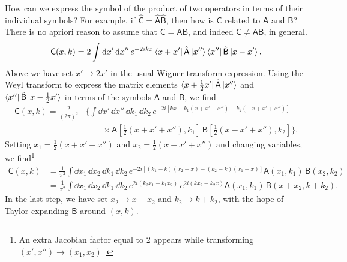 How can we express the symbol of the product of two operators in terms of their individual symbols?
For example, if $\hat{\mathsf{C}} = \hat{\mathsf{A}}\hat{\mathsf{B}}$, then how is $\mathsf{C}$ related to $\mathsf{A}$ and $\mathsf{B}$?
There is no apriori reason to assume that $\mathsf{C} = \mathsf{A}\mathsf{B}$, and indeed $\mathsf{C} \neq \mathsf{A}\mathsf{B}$, in general.
%
\begin{equation}
  \mathsf{C}(x, k) = 2\int \mathrm{d}{x'}\, \mathrm{d}{x''} \,e^{-2ikx} \mathinner{\langle{x + x'}\rvert}\hat{\mathsf{A}}\mathinner{\lvert{x''}\rangle}\mathinner{\langle{x''}\rvert}\hat{\mathsf{B}}\mathinner{\lvert{x - x'}\rangle}.
\end{equation}
%
Above we have set $x' \to 2x'$ in the usual Wigner transform expression.
Using the Weyl transform to express the matrix elements $\mathinner{\langle{x + \frac{1}{2}x'}\rvert}\hat{\mathsf{A}}\mathinner{\lvert{x''}\rangle}$ and $\mathinner{\langle{x''}\rvert}\hat{\mathsf{B}}\mathinner{\lvert{x - \frac{1}{2}x'}\rangle}$ in terms of the symbols $\mathsf{A}$ and $\mathsf{B}$, we find
%
\begin{equation}
  \begin{aligned}
    \mathsf{C}(x, k) = \frac{2}{(2\pi)^{2}}& \bigg\{\int \dd{x'}\, \dd{x''}\, \dd{k_{1}}\, \dd{k_{2}}\,e^{-2i[kx - k_{1}(x + x' - x'') - k_{2}(-x + x' + x'')]}\\
                                           &\qquad\times \mathsf{A}\left[\tfrac{1}{2}(x + x' + x''), k_{1}\right]\, \mathsf{B}\left[\tfrac{1}{2}(x - x' + x''), k_{2}\right]\bigg\}.
  \end{aligned}
\end{equation}
%
Setting $x_{1} = \frac{1}{2}(x + x' + x'')$ and $x_{2} = \frac{1}{2}(x - x' + x'')$ and changing variables, we find\footnote{An extra Jacobian factor equal to 2 appears while transforming $(x', x'') \to (x_{1}, x_{2})$~\cite[Eq.~(2.3.23) and Problem~2.3.8]{chaichian2001}}
%
\begin{equation}
  \begin{aligned}
    \mathsf{C}(x, k) &= \frac{1}{\pi^{2}} \int \dd{x_{1}}\, \dd{x_{2}}\, \dd{k_{1}}\, \dd{k_{2}}\,e^{-2i[(k_{1} - k)(x_{2} - x) - (k_{2} - k)(x_{1} - x)]} \mathsf{A}(x_{1}, k_{1})\, \mathsf{B}(x_{2}, k_{2})\\
                     &= \frac{1}{\pi^{2}} \int \dd{x_{1}}\, \dd{x_{2}}\, \dd{k_{1}}\, \dd{k_{2}}\,e^{2i(k_{2}x_{1} - k_{1}x_{2})}\,e^{2i(kx_{2} - k_{2}x)} \mathsf{A}(x_{1}, k_{1})\, \mathsf{B}(x + x_{2}, k + k_{2}).\label{eq:moyal1}
  \end{aligned}
\end{equation}
%
In the last step, we have set $x_{2} \to x + x_{2}$ and $k_{2} \to k + k_{2}$, with the hope of Taylor expanding $\mathsf{B}$ around $(x, k)$.
